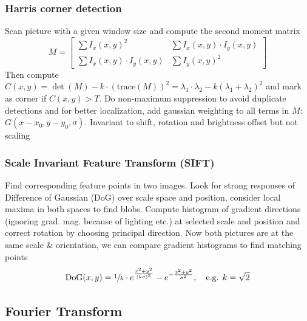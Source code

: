 \documentclass[a4paper,10pt]{article}
\begin{document}
\subsubsection{Harris corner detection} Scan picture with a given window size and compute the second moment matrix \[ M = \left[\begin{smallmatrix}\sum I_x(x,y)^2 & \sum I_x(x,y)\cdot I_y(x,y) \\ \sum I_x(x,y)\cdot I_y(x,y) & \sum I_y(x,y)^2 \end{smallmatrix}\right] \] Then compute \( C(x,y) = \det(M) - k\cdot (\text{trace}(M))^2 = \lambda_1 \cdot \lambda_2 - k(\lambda_1 + \lambda_2)^2 \) and mark as corner if \( C(x,y) > T \). Do non-maximum suppression to avoid duplicate detections and for better localization, add gaussian weighting to all terms in \( M \): \( G(x-x_0, y-y_0, \sigma) \). Invariant to shift, rotation and brightness offset but not scaling
\subsubsection{Scale Invariant Feature Transform (SIFT)} Find corresponding feature points in two images. Look for strong responses of Difference of Gaussian (DoG) over scale space and position, consider local maxima in both spaces to find blobs. Compute histogram of gradient directions (ignoring grad. mag. because of lighting etc.) at selected scale and position and correct rotation by choosing principal direction. Now both pictures are at the same scale \& orientation, we can compare gradient histograms to find matching points \[
	\text{DoG}(x,y) = \sfrac{1}{k} \cdot  e^{\frac{x^2+y^2}{(k\sigma)^2}} - e^{-\frac{x^2+y^2}{\sigma ^2}}, \quad \text{e.g. } k=\sqrt{2} 
\] 

\subsection{Fourier Transform}
\end{document}
